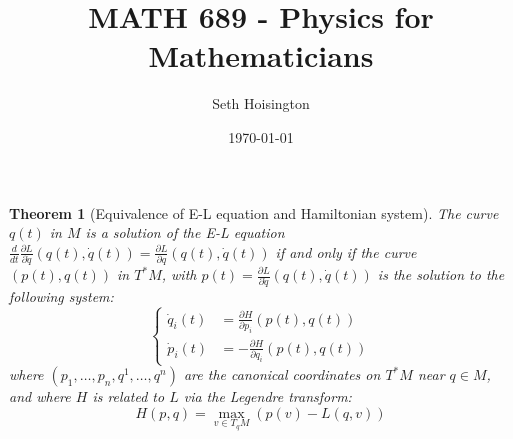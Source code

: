 \documentclass{article}
\title{MATH 689 - Physics for Mathematicians}
\author{Seth Hoisington}
\date{\today}
\newcommand{\pdof}[2]{\frac{\partial #1}{\partial #2}}
\newtheorem{thm}{Theorem}
\begin{document}
\maketitle
\begin{thm} [Equivalence of E-L equation and Hamiltonian system]
     The curve $q(t)$ in $M$ is a solution of the E-L equation $\frac{d}{dt}\pdof{L}{\dot q}(q(t),\dot q(t)) = \pdof{L}{q}(q(t),\dot q(t))$ if and only if the curve $(p(t),q(t))$ in $T^*M$, with $p(t) = \pdof{L}{\dot q}(q(t),\dot q(t))$ is the solution to the following system:
     \[\left\{\begin{aligned}
         \dot q_i(t) &= \pdof{H}{p_i}(p(t),q(t))\\
         \dot p_i(t) &= -\pdof{H}{q_i}(p(t),q(t))
     \end{aligned}\right.\]
     where $(p_1,\dots,p_n,q^1,\dots,q^n)$ are the canonical coordinates on $T^*M$ near $q\in M$, and where $H$ is related to $L$ via the Legendre transform:
     \[H(p,q) = \max_{v\in T_qM}(p(v) - L(q,v))\]
\end{thm}
\end{document}
